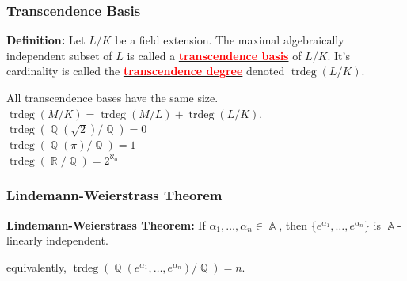 \documentclass{beamer}
\newcommand{\vocab}[1]{\underline{\textbf{\textcolor{red}{#1}}}}
\DeclareMathOperator{\A}{\mathbb{A}}
\DeclareMathOperator{\Q}{\mathbb{Q}}
\DeclareMathOperator{\R}{\mathbb{R}}
\DeclareMathOperator{\trdeg}{trdeg}
\begin{document}
    \begin{frame}
        \frametitle{Transcendence Basis}
        \begin{center}
            \begin{mybox}
                \textbf{Definition:} Let $L/K$ be a field extension. The maximal algebraically independent subset of $L$ is called a \vocab{transcendence basis} of $L/K$. It's cardinality is called the \vocab{transcendence degree} denoted $\trdeg(L/K)$.
            \end{mybox}
            All transcendence bases have the same size. 
            $\trdeg(M/K) = \trdeg(M/L) + \trdeg(L/K)$. \\
            $\trdeg(\Q(\sqrt{2})/\Q) = 0$ \\ $\trdeg(\Q(\pi)/\Q) = 1$ \\ $\trdeg(\R/\Q) = 2^{\aleph_0}$
        \end{center}
    \end{frame}

    \begin{frame}
        \frametitle{Lindemann-Weierstrass Theorem}
        \begin{center}
            \begin{mybox}
                \textbf{Lindemann-Weierstrass Theorem:} If $\alpha_1, \ldots, \alpha_n \in \A$, then $\{e^{\alpha_1}, \ldots, e^{\alpha_n}\}$ is $\A$-linearly independent.
            \end{mybox}       
            equivalently, $\trdeg(\Q(e^{\alpha_1}, \ldots, e^{\alpha_n})/\Q) = n$.
        \end{center}
    \end{frame}
\end{document}
